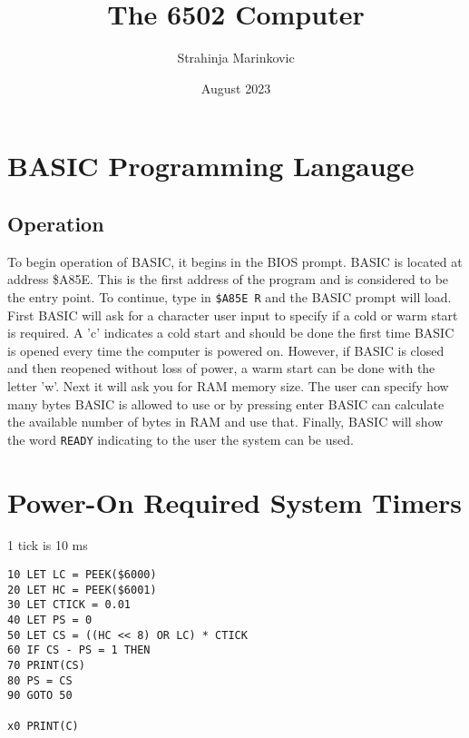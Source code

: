 \documentclass[12pt, letterpaper]{article}
\title{The 6502 Computer}
\author{Strahinja Marinkovic}
\date{August 2023}
\begin{document}
\maketitle

\newpage
\section{BASIC Programming Langauge}
\subsection{Operation}

To begin operation of BASIC, it begins in the BIOS prompt. BASIC is located at address \$A85E. This is the first address of the
program and is considered to be the entry point. To continue, type in \texttt{\$A85E R} and the BASIC prompt will load.
First BASIC will ask for a character user input to specify if a cold or warm start is required. A 'c' indicates a cold start and should be done the first time BASIC is opened every time the computer is powered on. However, if BASIC is closed and then reopened without loss of power, a warm start can be done with the letter 'w'. Next it will ask you for RAM memory size. The user can specify how many bytes BASIC is allowed to use or by pressing enter BASIC can calculate the available number of bytes in RAM and use that. Finally, BASIC will show the word \texttt{READY} indicating to the user the system can be used.


\section{Power-On Required System Timers}
1 tick is 10 ms
\begin{verbatim}
10 LET LC = PEEK($6000)
20 LET HC = PEEK($6001)
30 LET CTICK = 0.01
40 LET PS = 0
50 LET CS = ((HC << 8) OR LC) * CTICK
60 IF CS - PS = 1 THEN
70 PRINT(CS)
80 PS = CS
90 GOTO 50

x0 PRINT(C)
\end{verbatim}
\end{document}
